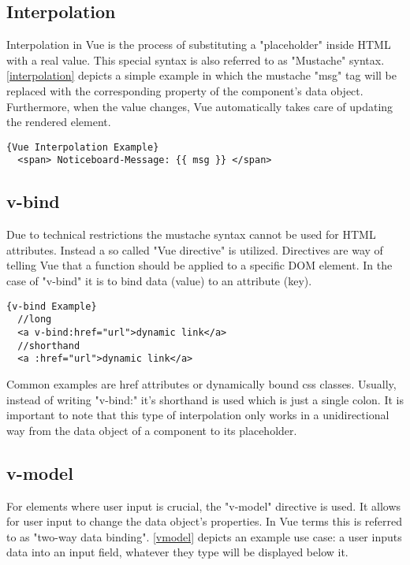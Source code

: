 \subsection{Interpolation}
Interpolation in Vue is the process of substituting a "placeholder" inside HTML with a real value. This special syntax is also referred to as "Mustache" syntax. \autoref{interpolation} depicts a simple example in which the mustache "msg" tag will be replaced with the corresponding property of the component's data object. Furthermore, when the value changes, Vue automatically takes care of updating the rendered element. \newline

\begin{lstlisting}[caption=Interpolation Example, captionpos=b, style=htmlcssjs, label=interpolation]{Vue Interpolation Example}
  <span> Noticeboard-Message: {{ msg }} </span> 
\end{lstlisting}

\subsection{v-bind}
Due to technical restrictions the mustache syntax cannot be used for HTML attributes. Instead a so called "Vue directive" is utilized. Directives are way of telling Vue that a function should be applied to a specific DOM element. In the case of "v-bind" it is to bind data (value) to an attribute (key). \newline

\begin{lstlisting}[caption=v-bind Example, captionpos=b, style=htmlcssjs, label=vbind]{v-bind Example}
  //long
  <a v-bind:href="url">dynamic link</a>
  //shorthand
  <a :href="url">dynamic link</a>
\end{lstlisting}

Common examples are href attributes or dynamically bound css classes. Usually, instead of writing "v-bind:" it's shorthand is used which is just a single colon. It is important to note that this type of interpolation only works in a unidirectional way from the data object of a component to its placeholder. 

\subsection{v-model} \label{sub:vmodel}
For elements where user input is crucial, the "v-model" directive is used. It allows for user input to change the data object's properties. In Vue terms this is referred to as "two-way data binding". \autoref{vmodel} depicts an example use case: a user inputs data into an input field, whatever they type will be displayed below it. \newline

